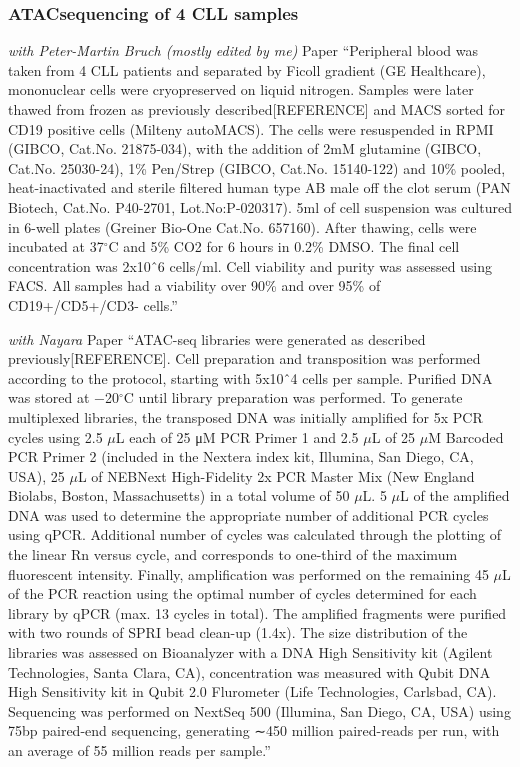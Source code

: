 \documentclass[11pt, a4paper, twosided]{book}
\begin{document}
\hypertarget{atacsequencing-of-4-cll-samples}{%
\subsubsection{ATACsequencing of 4 CLL samples}\label{atacsequencing-of-4-cll-samples}}

\emph{with Peter-Martin Bruch (mostly edited by me)} Paper
``Peripheral blood was taken from 4 CLL patients and separated by Ficoll gradient (GE Healthcare), mononuclear cells were cryopreserved on liquid nitrogen. Samples were later thawed from frozen as previously described{[}REFERENCE{]} and MACS sorted for CD19 positive cells (Milteny autoMACS). The cells were resuspended in RPMI (GIBCO, Cat.No. 21875-034), with the addition of 2mM glutamine (GIBCO, Cat.No. 25030-24), 1\% Pen/Strep (GIBCO, Cat.No. 15140-122) and 10\% pooled, heat-inactivated and sterile filtered human type AB male off the clot serum (PAN Biotech, Cat.No. P40-2701, Lot.No:P-020317). 5ml of cell suspension was cultured in 6-well plates (Greiner Bio-One Cat.No. 657160). After thawing, cells were incubated at 37\(^\circ\)C and 5\% CO2 for 6 hours in 0.2\% DMSO. The final cell concentration was 2x10ˆ6 cells/ml. Cell viability and purity was assessed using FACS. All samples had a viability over 90\% and over 95\% of CD19+/CD5+/CD3- cells.''

\emph{with Nayara} Paper
``ATAC-seq libraries were generated as described previously{[}REFERENCE{]}. Cell preparation and transposition was performed according to the protocol, starting with 5x10ˆ4 cells per sample. Purified DNA was stored at −20\(^\circ\)C until library preparation was performed. To generate multiplexed libraries, the transposed DNA was initially amplified for 5x PCR cycles using 2.5 \(\mu\)L each of 25 μM PCR Primer 1 and 2.5 \(\mu\)L of 25 \(\mu\)M Barcoded PCR Primer 2 (included in the Nextera index kit, Illumina, San Diego, CA, USA), 25 \(\mu\)L of NEBNext High-Fidelity 2x PCR Master Mix (New England Biolabs, Boston, Massachusetts) in a total volume of 50 \(\mu\)L. 5 \(\mu\)L of the amplified DNA was used to determine the appropriate number of additional PCR cycles using qPCR. Additional number of cycles was calculated through the plotting of the linear Rn versus cycle, and corresponds to one-third of the maximum fluorescent intensity. Finally, amplification was performed on the remaining 45 \(\mu\)L of the PCR reaction using the optimal number of cycles determined for each library by qPCR (max. 13 cycles in total). The amplified fragments were purified with two rounds of SPRI bead clean-up (1.4x). The size distribution of the libraries was assessed on Bioanalyzer with a DNA High Sensitivity kit (Agilent Technologies, Santa Clara, CA), concentration was measured with Qubit DNA High Sensitivity kit in Qubit 2.0 Flurometer (Life Technologies, Carlsbad, CA). Sequencing was performed on NextSeq 500 (Illumina, San Diego, CA, USA) using 75bp paired-end sequencing, generating ∼450 million paired-reads per run, with an average of 55 million reads per sample.''
\end{document}
